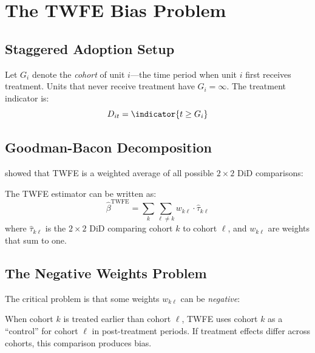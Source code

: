 \section{The TWFE Bias Problem}
\label{sec:twfe_bias}

\subsection{Staggered Adoption Setup}

Let $G_i$ denote the \emph{cohort} of unit $i$---the time period when unit $i$ first receives treatment. Units that never receive treatment have $G_i = \infty$. The treatment indicator is:
\begin{equation}
D_{it} = \indicator{t \geq G_i}
\end{equation}

\subsection{Goodman-Bacon Decomposition}

\citet{goodman2021difference} showed that TWFE is a weighted average of all possible $2 \times 2$ DiD comparisons:

\begin{theorem}
\label{thm:bacon}
The TWFE estimator can be written as:
\begin{equation}
\hat{\beta}^{\text{TWFE}} = \sum_{k} \sum_{\ell \neq k} w_{k\ell} \cdot \hat{\tau}_{k\ell}
\end{equation}
where $\hat{\tau}_{k\ell}$ is the $2 \times 2$ DiD comparing cohort $k$ to cohort $\ell$, and $w_{k\ell}$ are weights that sum to one.
\end{theorem}

\subsection{The Negative Weights Problem}

The critical problem is that some weights $w_{k\ell}$ can be \emph{negative}:

\begin{definition}
When cohort $k$ is treated earlier than cohort $\ell$, TWFE uses cohort $k$ as a ``control'' for cohort $\ell$ in post-treatment periods. If treatment effects differ across cohorts, this comparison produces bias.
\end{definition}

